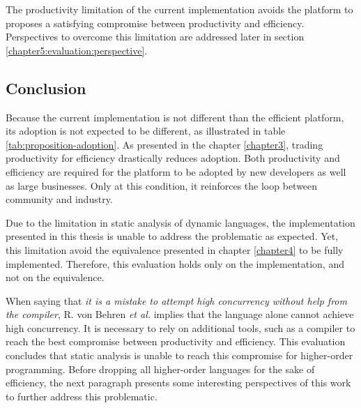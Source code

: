 The productivity limitation of the current implementation avoids the platform to proposes a satisfying compromise between productivity and efficiency.
Perspectives to overcome this limitation are addressed later in section \ref{chapter5:evaluation:perspective}.



\subsection{Conclusion}

Because the current implementation is not different than the efficient platform, its adoption is not expected to be different, as illustrated in table \ref{tab:proposition-adoption}.
As presented in the chapter \ref{chapter3}, trading productivity for efficiency drastically reduces adoption.
Both productivity and efficiency are required for the platform to be adopted by new developers as well as large businesses.
Only at this condition, it reinforces the loop between community and industry.



\separator

Due to the limitation in static analysis of dynamic languages, the implementation presented in this thesis is unable to address the problematic as expected.
Yet, this limitation avoid the equivalence presented in chapter \ref{chapter4} to be fully implemented.
Therefore, this evaluation holds only on the implementation, and not on the equivalence.


When saying that \textit{it is a mistake to attempt high concurrency without help from the compiler}, R. von Behren \textit{et al.} \cite{Behren2003} implies that the language alone cannot achieve high concurrency.
It is necessary to rely on additional tools, such as a compiler to reach the best compromise between productivity and efficiency.
This evaluation concludes that static analysis is unable to reach this compromise for higher-order programming.
Before dropping all higher-order languages for the sake of efficiency, the next paragraph presents some interesting perspectives of this work to further address this problematic.

